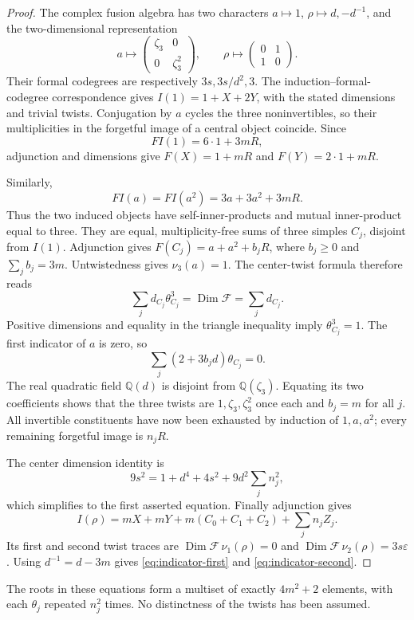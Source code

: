 \documentclass[11pt,a4paper]{article}
\theoremstyle{definition}
\begin{document}
\begin{proof}
The complex fusion algebra has two characters
$a\mapsto1$, $\rho\mapsto d,-d^{-1}$, and the two-dimensional
representation
\[
 a\longmapsto\begin{pmatrix}\zeta_3&0\\0&\zeta_3^2\end{pmatrix},
 \qquad \rho\longmapsto\begin{pmatrix}0&1\\1&0\end{pmatrix}.
\]
Their formal codegrees are respectively $3s,3s/d^2,3$.
The induction--formal-codegree correspondence
\cite[Theorems~2.5 and~2.13]{Ostrik13} gives
$I(1)=1+X+2Y$, with the stated dimensions and trivial twists.
Conjugation by $a$ cycles the three noninvertibles, so their
multiplicities in the forgetful image of a central object coincide.
Since
\[
 FI(1)=6\cdot1+3mR,
\]
adjunction and dimensions give $F(X)=1+mR$ and $F(Y)=2\cdot1+mR$.

Similarly,
\[
 FI(a)=FI(a^2)=3a+3a^2+3mR.
\]
Thus the two induced objects have self-inner-products and mutual
inner-product equal to three. They are equal, multiplicity-free sums
of three simples $C_j$, disjoint from $I(1)$. Adjunction gives
$F(C_j)=a+a^2+b_jR$, where $b_j\ge0$ and $\sum_jb_j=3m$.
Untwistedness gives $\nu_3(a)=1$. The center-twist formula
\cite[Theorem~4.1]{NS} therefore reads
\[
 \sum_jd_{C_j}\theta_{C_j}^3=\operatorname{Dim}\mathcal F
                         =\sum_jd_{C_j}.
\]
Positive dimensions and equality in the triangle inequality imply
$\theta_{C_j}^3=1$. The first indicator of $a$ is zero, so
\[
 \sum_j(2+3b_jd)\theta_{C_j}=0.
\]
The real quadratic field $\mathbb Q(d)$ is disjoint from
$\mathbb Q(\zeta_3)$. Equating its two coefficients shows that the
three twists are $1,\zeta_3,\zeta_3^2$ once each and $b_j=m$ for all
$j$. All invertible constituents have now been exhausted by induction
of $1,a,a^2$; every remaining forgetful image is $n_jR$.

The center dimension identity is
\[
 9s^2=1+d^4+4s^2+9d^2\sum_j n_j^2,
\]
which simplifies to the first asserted equation. Finally adjunction
gives
\[
 I(\rho)=mX+mY+m(C_0+C_1+C_2)+\sum_jn_jZ_j.
\]
Its first and second twist traces are
$\operatorname{Dim}\mathcal F\,\nu_1(\rho)=0$ and
$\operatorname{Dim}\mathcal F\,\nu_2(\rho)=3s\varepsilon$.
Using $d^{-1}=d-3m$ gives \eqref{eq:indicator-first} and
\eqref{eq:indicator-second}.
\end{proof}

The roots in these equations form a multiset of exactly $4m^2+2$
elements, with each $\theta_j$ repeated $n_j^2$ times. No distinctness
of the twists has been assumed.
\end{document}
